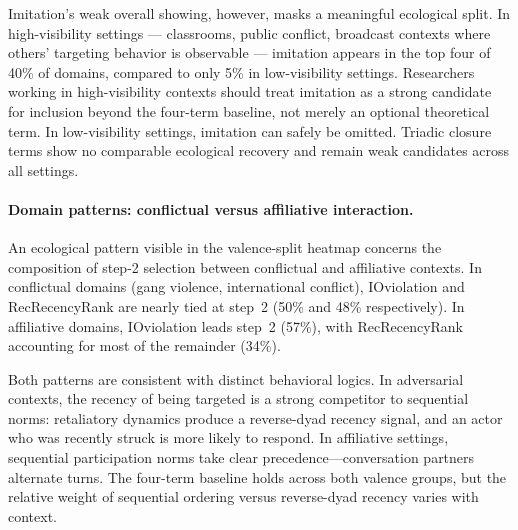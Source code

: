 \documentclass[11pt]{article}
\begin{document}
Imitation's weak overall showing, however, masks a meaningful ecological split.
In high-visibility settings --- classrooms, public conflict, broadcast contexts
where others' targeting behavior is observable --- imitation appears in the top
four of 40\% of domains, compared to only 5\% in low-visibility settings.
Researchers working in high-visibility contexts should treat imitation as a
strong candidate for inclusion beyond the four-term baseline, not merely an
optional theoretical term. In low-visibility settings, imitation can safely be
omitted. Triadic closure terms show no comparable ecological recovery and remain
weak candidates across all settings.

\paragraph{Domain patterns: conflictual versus affiliative interaction.}
An ecological pattern visible in the valence-split heatmap concerns
the composition of step-2 selection between conflictual and affiliative contexts.
In conflictual domains (gang violence, international conflict), IOviolation and
RecRecencyRank are nearly tied at step~2 (50\% and 48\% respectively). In
affiliative domains, IOviolation leads step~2 (57\%), with RecRecencyRank
accounting for most of the remainder (34\%).

Both patterns are consistent with distinct behavioral logics. In adversarial
contexts, the recency of being targeted is a strong competitor to sequential
norms: retaliatory dynamics produce a reverse-dyad recency signal, and an actor
who was recently struck is more likely to respond. In affiliative settings,
sequential participation norms take clear precedence---conversation partners
alternate turns. The four-term baseline holds across both valence groups, but the relative weight of
sequential ordering versus reverse-dyad recency varies with context.
\end{document}
